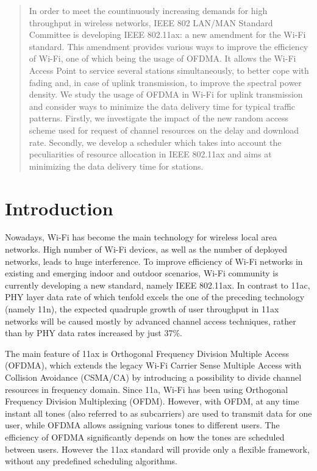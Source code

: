 \begin{abstract}
In order to meet the countinuously increasing demands for high throughput in wireless networks, IEEE 802 LAN/MAN Standard Committee is developing IEEE 802.11ax: a new amendment for the Wi-Fi standard.
This amendment provides various ways to improve the efficiency of Wi-Fi, one of which being the usage of OFDMA.
It allows the Wi-Fi Access Point to service several stations simultaneously, to better cope with fading and, in case of uplink transmission, to improve the spectral power density.
We study the usage of OFDMA in Wi-Fi for uplink transmission and consider ways to minimize the data delivery time for typical traffic patterns.
Firstly, we investigate the impact of the new random access scheme used for request of channel resources on the delay and download rate.
Secondly, we develop a scheduler which takes into account the peculiarities of resource allocation in IEEE 802.11ax and aims at minimizing the data delivery time for stations.
\end{abstract}

\section{Introduction}
Nowadays, Wi-Fi has become the main technology for wireless local area networks. High number of Wi-Fi devices, as well as the number of deployed networks, leads to huge interference. To improve efficiency of Wi-Fi networks in existing and emerging indoor and outdoor scenarios, Wi-Fi community is currently developing a new standard, namely IEEE 802.11ax. 
In contrast to 11ac, PHY layer data rate of which tenfold excels the one of the preceding technology (namely 11n), the expected quadruple growth of user throughput in 11ax networks will be caused mostly by advanced channel access techniques, rather than by PHY data rates increased by just 37\%.

The main feature of 11ax is Orthogonal Frequency Division Multiple Access (OFDMA), which extends the legacy Wi-Fi Carrier Sense Multiple Access with Collision Avoidance (CSMA/CA) by introducing a possibility to divide channel resources in frequency domain. Since 11a, Wi-Fi has been using Orthogonal Frequency Division Multiplexing (OFDM). However, with OFDM, at any time instant all tones (also referred to as subcarriers) are used to transmit data for one user, while OFDMA allows assigning various tones to different users. The efficiency of OFDMA significantly depends on how the tones are scheduled between users. However the 11ax standard will provide only a flexible framework, without any predefined scheduling algorithms. 

